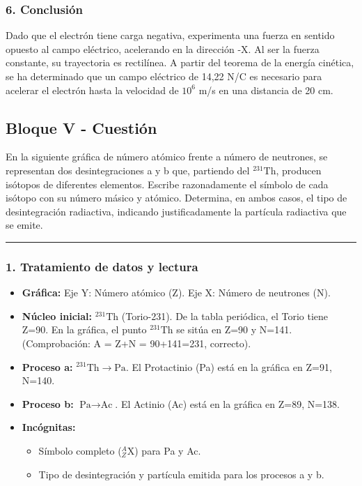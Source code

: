 \subsubsection*{6. Conclusión}
\begin{cajaconclusion}
Dado que el electrón tiene carga negativa, experimenta una fuerza en sentido opuesto al campo eléctrico, acelerando en la dirección -X. Al ser la fuerza constante, su trayectoria es rectilínea. A partir del teorema de la energía cinética, se ha determinado que un campo eléctrico de 14,22 N/C es necesario para acelerar el electrón hasta la velocidad de $10^6$ m/s en una distancia de 20 cm.
\end{cajaconclusion}

\newpage

\subsection{Bloque V - Cuestión}
\label{subsec:A5_2014_jul_ext}

\begin{cajaenunciado}
En la siguiente gráfica de número atómico frente a número de neutrones, se representan dos desintegraciones a y b que, partiendo del ${}^{231}\text{Th}$, producen isótopos de diferentes elementos. Escribe razonadamente el símbolo de cada isótopo con su número másico y atómico. Determina, en ambos casos, el tipo de desintegración radiactiva, indicando justificadamente la partícula radiactiva que se emite. 
\end{cajaenunciado}
\hrule

\subsubsection*{1. Tratamiento de datos y lectura}
\begin{itemize}
    \item \textbf{Gráfica:} Eje Y: Número atómico (Z). Eje X: Número de neutrones (N).
    \item \textbf{Núcleo inicial:} ${}^{231}\text{Th}$ (Torio-231). De la tabla periódica, el Torio tiene Z=90. En la gráfica, el punto ${}^{231}\text{Th}$ se sitúa en Z=90 y N=141. (Comprobación: A = Z+N = 90+141=231, correcto).
    \item \textbf{Proceso a:} ${}^{231}\text{Th} \rightarrow \text{Pa}$. El Protactinio (Pa) está en la gráfica en Z=91, N=140.
    \item \textbf{Proceso b:} $\text{Pa} \rightarrow \text{Ac}$. El Actinio (Ac) está en la gráfica en Z=89, N=138.
    \item \textbf{Incógnitas:}
        \begin{itemize}
            \item Símbolo completo ($^{A}_{Z}\text{X}$) para Pa y Ac.
            \item Tipo de desintegración y partícula emitida para los procesos a y b.
        \end{itemize}
\end{itemize}

